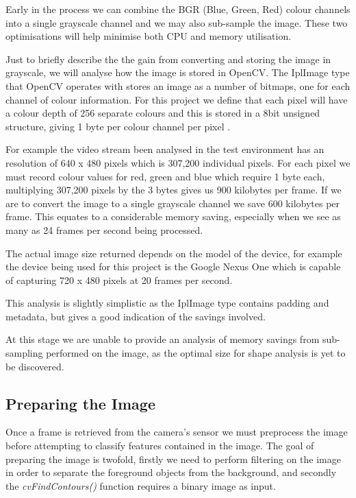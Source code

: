 Early in the process we can combine the BGR (Blue, Green, Red) colour channels into a single grayscale channel and we may also sub-sample the image. These two optimisations will help minimise both CPU and memory utilisation.

Just to briefly describe the the gain from converting and storing the image in grayscale, we will analyse how the image is stored in OpenCV. The IplImage type that OpenCV operates with stores an image as a number of bitmaps, one for each channel of colour information. For this project we define that each pixel will have a colour depth of 256 separate colours and this is stored in a 8bit unsigned structure, giving 1 byte per colour channel per pixel  \cite{morganIPL06}.

For example the video stream been analysed in the test environment has an resolution of 640 x 480 pixels which is 307,200 individual pixels. For each pixel we must record colour values for red, green and blue which require 1 byte each, multiplying 307,200 pixels by the 3 bytes gives us 900 kilobytes per frame. If we are to convert the image to a single grayscale channel we save 600 kilobytes per frame. This equates to a considerable memory saving, especially when we see as many as 24 frames per second being processed.

The actual image size returned depends on the model of the device, for example the device being used for this project is the Google Nexus One which is capable of capturing 720 x 480 pixels at 20 frames per second.

This analysis is slightly simplistic as the IplImage type contains padding and metadata, but gives a good indication of the savings involved.

At this stage we are unable to provide an analysis of memory savings from sub-sampling performed on the image, as the optimal size for shape analysis is yet to be discovered.


\subsection{Preparing the Image}

Once a frame is retrieved from the camera's sensor we must preprocess the image before attempting to classify features contained in the image. The goal of preparing the image is twofold, firstly we need to perform filtering on the image in order to separate the foreground objects from the background, and secondly the \emph{cvFindContours()} function requires a binary image as input.

